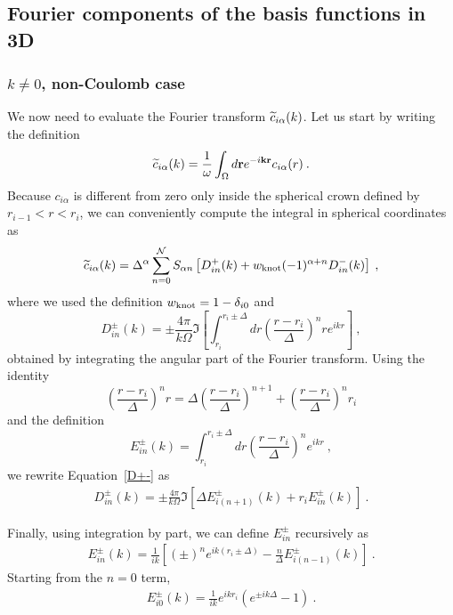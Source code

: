 \subsection{Fourier components of the basis functions in 3D}
\subsubsection*{$k\ne 0$, non-Coulomb case}
We now need to evaluate the Fourier transform $\widetilde{c}_{i\alpha}(k)$. Let us start
by writing the definition
\begin{equation}
\widetilde{c}_{i\alpha}(k)=\frac{1}{\omega}\int_\Omega d\mathbf{r}  e^{-i\mathbf{k}\mathbf{r}} c_{i\alpha}(r)\:.
\end{equation}
Because $c_{i\alpha}$ is different from zero only inside the spherical crown
defined by $r_{i-1}<r<r_i$, we can conveniently compute the integral in spherical
coordinates as
\begin{eqnarray}
\widetilde{c}_{i\alpha}(k)=\Delta^\alpha\sum_{n=0}^\mathcal{N} S_{\alpha n} \left[
D_{in}^+(k) +w_{\text{knot}}(-1)^{\alpha+n}D_{in}^-(k)\right]\:,
\label{fourier_transform}
\end{eqnarray}
where we used the definition $w_{\text{knot}}=1-\delta_{i0}$ and
\begin{equation}
D_{in}^\pm(k)=\pm\frac{4\pi}{k\Omega}\Im\left[\int_{r_i}^{r_i\pm\Delta}
dr\left(\frac{r-r_i}{\Delta}\right)^n r e^{ikr}\right]\:,
\label{D+-}
\end{equation}
obtained by integrating the angular part of the Fourier transform.
Using the identity
\begin{equation}
\left(\frac{r-r_i}{\Delta}\right)^n r=\Delta\left(\frac{r-r_i}{\Delta}\right)^{n+1}+\left(\frac{r-r_i}{\Delta}\right)^n r_i
\end{equation}
and the definition
\begin{equation}
E_{in}^\pm(k)=\int_{r_i}^{r_i\pm\Delta}
dr\left(\frac{r-r_i}{\Delta}\right)^n e^{ikr}\:,
\end{equation}
we rewrite Equation~\ref{D+-} as
\begin{eqnarray}
D_{in}^\pm(k)=\pm\frac{4\pi}{k\Omega}\Im\left[\Delta E_{i(n+1)}^\pm(k)+
r_i E_{in}^\pm(k)\right]\:.
\label{noncoulD+-}
\end{eqnarray}

Finally, using integration by part, we can define $E^\pm_{in}$ recursively as
\begin{eqnarray}
E^\pm_{in}(k)=\frac{1}{ik}\left[(\pm)^ne^{ik(r_i\pm\Delta)}-\frac{n}{\Delta}
E^\pm_{i(n-1)}(k)\right]\:.
\label{nthEpm}
\end{eqnarray}
\noindent
Starting from the $n=0$ term,
\begin{eqnarray}
E^\pm_{i0}(k)=\frac{1}{ik}e^{ikr_i}\left(e^{\pm ik\Delta}-1\right)\:.
\label{0thEpm}
\end{eqnarray}
